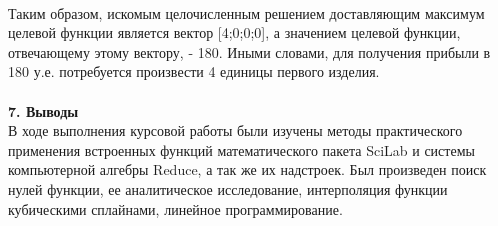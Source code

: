 \documentclass[russian,utf8,nocolumnxxxi,nocolumnxxxii]{eskdtext}
\begin{document}
\\
Таким образом, искомым целочисленным решением доставляющим максимум целевой функции является вектор [4;0;0;0], а значением целевой функции, отвечающему этому вектору, - 180. Иными словами, для получения прибыли в 180 у.е. потребуется произвести 4 единицы первого изделия.
\\
\\
{\bf 7. Выводы}\\
В ходе выполнения курсовой работы были изучены методы практического применения встроенных функций математического пакета SciLab и системы компьютерной алгебры Reduce, а так же их надстроек. Был произведен поиск нулей функции, ее аналитическое исследование, интерполяция функции кубическими сплайнами, линейное программирование.
\end{document}

